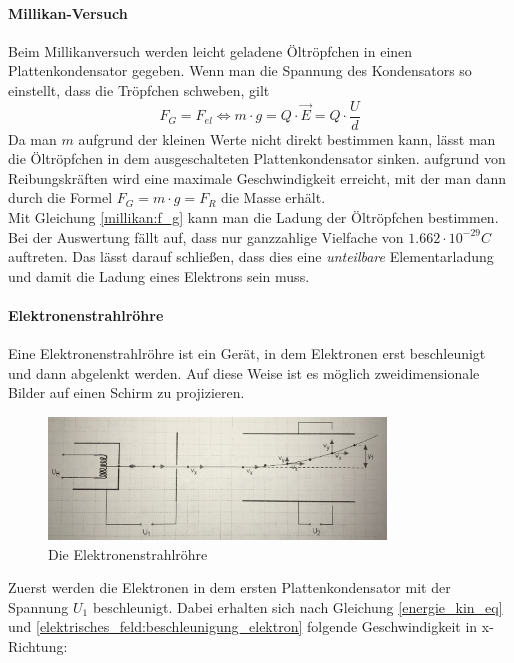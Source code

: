\documentclass[a4paper]{article}
\begin{document}
				\paragraph{Millikan-Versuch}
					
					Beim Millikanversuch werden leicht geladene Öltröpfchen in einen Plattenkondensator gegeben. Wenn man die Spannung des Kondensators so einstellt, dass die Tröpfchen schweben, gilt
					\begin{equation}\label{millikan:f_g}
						F_G=F_{el}\Leftrightarrow m\cdot g = Q\cdot \vec{E} = Q\cdot\frac{U}{d}
					\end{equation}
					Da man $m$ aufgrund der kleinen Werte nicht direkt bestimmen kann, lässt man die Öltröpfchen in dem ausgeschalteten Plattenkondensator sinken. aufgrund von Reibungskräften wird eine maximale Geschwindigkeit erreicht, mit der man dann durch die Formel $F_G=m\cdot g =F_R$ die Masse erhält.\\
					Mit Gleichung \ref{millikan:f_g} kann man die Ladung der Öltröpfchen bestimmen. Bei der Auswertung fällt auf, dass nur ganzzahlige Vielfache von $1.662\cdot 10^{-29}C$ auftreten. Das lässt darauf schließen, dass dies eine \textit{unteilbare} Elementarladung und damit die Ladung eines Elektrons sein muss.
					
				\paragraph{Elektronenstrahlröhre}
					Eine Elektronenstrahlröhre ist ein Gerät, in dem Elektronen erst beschleunigt und dann abgelenkt werden. Auf diese Weise ist es möglich zweidimensionale Bilder auf einen Schirm zu projizieren.
					\begin{figure}[H]
						\centering
						\includegraphics[width=0.8\textwidth]{img/elektronenstrahlroehre.jpg}
						\caption{Die Elektronenstrahlröhre}
						\label{img:elektronenstrahlroehre}
					\end{figure}
					\noindent Zuerst werden die Elektronen in dem ersten Plattenkondensator mit der Spannung $U_1$ beschleunigt. Dabei erhalten sich nach Gleichung  \ref{energie_kin_eq} und \ref{elektrisches_feld:beschleunigung_elektron} folgende Geschwindigkeit in x-Richtung:
					
\end{document}
